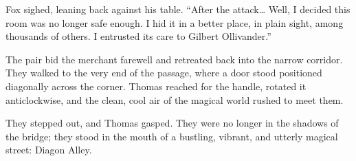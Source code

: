 Fox sighed, leaning back against his table. \enquote{After the attack\ldots{} Well, I decided this room was no longer safe enough. I hid it in a better place, in plain sight, among thousands of others. I entrusted its care to Gilbert Ollivander.}

The pair bid the merchant farewell and retreated back into the narrow corridor. They walked to the very end of the passage, where a door stood positioned diagonally across the corner. Thomas reached for the handle, rotated it anticlockwise, and the clean, cool air of the magical world rushed to meet them.

They stepped out, and Thomas gasped. They were no longer in the shadows of the bridge; they stood in the mouth of a bustling, vibrant, and utterly magical street: Diagon Alley.